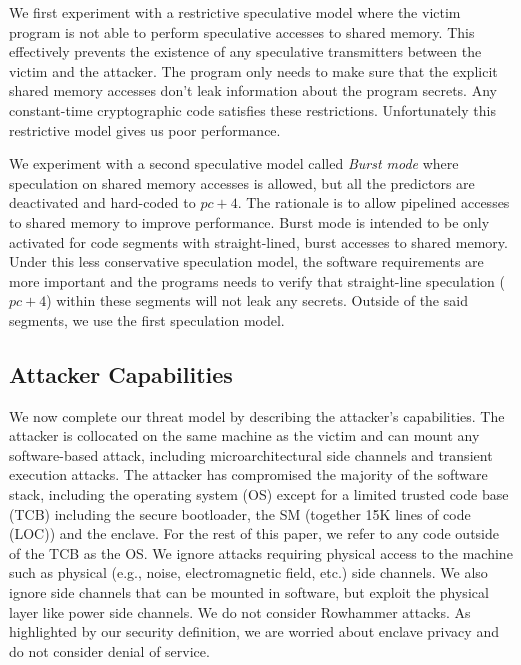 We first experiment with a restrictive speculative model where the victim program is not able to perform speculative accesses to shared memory.
This effectively prevents the existence of any speculative transmitters between the victim and the attacker.
The program only needs to make sure that the explicit shared memory accesses don't leak information about the program secrets.
Any constant-time cryptographic code satisfies these restrictions.
Unfortunately this restrictive model gives us poor performance.

We experiment with a second speculative model called \emph{Burst mode} where speculation on shared memory accesses is allowed, but all the predictors are deactivated and hard-coded to $pc+4$.
The rationale is to allow pipelined accesses to shared memory to improve performance.
Burst mode is intended to be only activated for code segments with straight-lined, burst accesses to shared memory.
Under this less conservative speculation model, the software requirements are more important and the programs needs to verify that straight-line speculation ($pc+4$) within these segments will not leak any secrets. Outside of the said segments, we use the first speculation model.

\subsection{Attacker Capabilities}

We now complete our threat model by describing the attacker's capabilities.
The attacker is collocated on the same machine as the victim and can mount any software-based attack, including microarchitectural side channels and transient execution attacks. The attacker has compromised the majority of the software stack, including the operating system (OS) except for a limited trusted code base (TCB) including the secure bootloader, the SM (together 15K lines of code (LOC)) and the enclave. 
For the rest of this paper, we refer to any code outside of the TCB as the OS.
We ignore attacks requiring physical access to the machine such as physical (e.g., noise, electromagnetic field, etc.) side channels. 
We also ignore side channels that can be mounted in software, but exploit the physical layer like power side channels.
We do not consider Rowhammer attacks.
As highlighted by our security definition, we are worried about enclave privacy and do not consider denial of service.